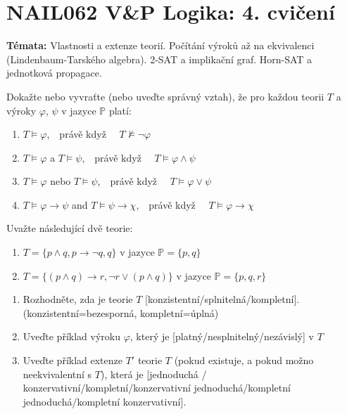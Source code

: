 \documentclass[a4paper,12pt]{article}
\begin{document}
\section*{NAIL062 V\&P Logika: 4. cvičení}

\textbf{Témata:} 
Vlastnosti a extenze teorií. Počítání výroků až na ekvivalenci (Lindenbaum-Tarského algebra). 2-SAT a implikační graf. Horn-SAT a jednotková propagace.



\medskip\begin{problem}
    Dokažte nebo vyvraťte (nebo uveďte správný vztah), že pro každou teorii $T$ a výroky $\varphi$, $\psi$ v jazyce $\mathbb{P}$ platí:
    \begin{enumerate}
        \item $T \models \varphi$,\ \  právě když \ \ $T \not\models \neg \varphi$
        \item $T \models \varphi$ a $T \models \psi$,\ \ právě když \ \ $T \models \varphi \wedge \psi$
        \item $T \models \varphi$ nebo $T \models \psi$,\ \ právě když \ \ $T \models \varphi \vee \psi$
        \item $T \models \varphi \to \psi$ and $T \models \psi \to \chi$,\ \ právě když \ \ $T \models \varphi \to \chi$
    \end{enumerate}
    \end{problem}

\medskip\begin{problem}
    Uvažte následující dvě teorie:
    \begin{enumerate}[label=(\Roman*)]
        \item $T=\{p\wedge q,p\to\neg q,q\}$ v jazyce $\mathbb P=\{p,q\}$
        \item $T=\{(p\wedge q)\to r, \neg r\vee(p\wedge q)\}$ v jazyce $\mathbb P=\{p,q,r\}$        
    \end{enumerate}
    \begin{enumerate}
        \item Rozhodněte, zda je teorie $T$ [konzistentní/splnitelná/kompletní]. (konzistentní=bezesporná, kompletní=úplná)
        \item Uveďte příklad výroku $\varphi$, který je [platný/nesplnitelný/nezávislý] v $T$
        \item Uveďte příklad extenze $T'$ teorie $T$ (pokud existuje, a pokud možno neekvivalentní s $T$), která je [jednoduchá / konzervativní/kompletní/konzervativní jednoduchá/kompletní jednoduchá/kompletní konzervativní].
    \end{enumerate}
    
    \end{problem}
\end{document}
